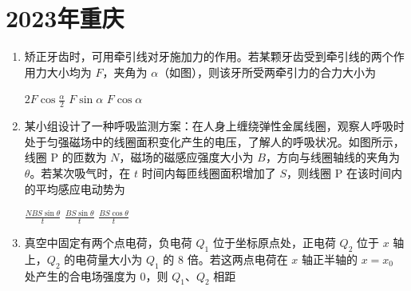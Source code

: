 \documentclass[\gkver]{gaokaozhenti}
\begin{document}
\chapter{2023年重庆}

\begin{enumerate}
\item
矫正牙齿时，可用牵引线对牙施加力的作用。若某颗牙齿受到牵引线的两个作用力大小均为 $F$，夹角为 $\alpha$（如图），则该牙所受两牵引力的合力大小为


{$2F\cos\frac{\alpha}{2}$}
{$F\sin\alpha$}
{$F\cos\alpha$}


\item
某小组设计了一种呼吸监测方案：在人身上缠绕弹性金属线圈，观察人呼吸时处于匀强磁场中的线圈面积变化产生的电压，了解人的呼吸状况。如图所示，线圈 P 的匝数为 $N$，磁场的磁感应强度大小为 $B$，方向与线圈轴线的夹角为 $\theta$。若某次吸气时，在 $t$ 时间内每匝线圈面积增加了 $S$，则线圈 P 在该时间内的平均感应电动势为


{$\frac{NBS\sin\theta}{t}$}
{$\frac{BS\sin\theta}{t}$}
{$\frac{BS\cos\theta}{t}$}


\item
真空中固定有两个点电荷，负电荷 $Q_{1}$ 位于坐标原点处，正电荷 $Q_{2}$ 位于 $x$ 轴上，$Q_{2}$ 的电荷量大小为 $Q_{1}$ 的 8 倍。若这两点电荷在 $x$ 轴正半轴的 $x=x_{0}$ 处产生的合电场强度为 0，则 $Q_{1}$、$Q_{2}$ 相距


\end{enumerate}
\end{document}
